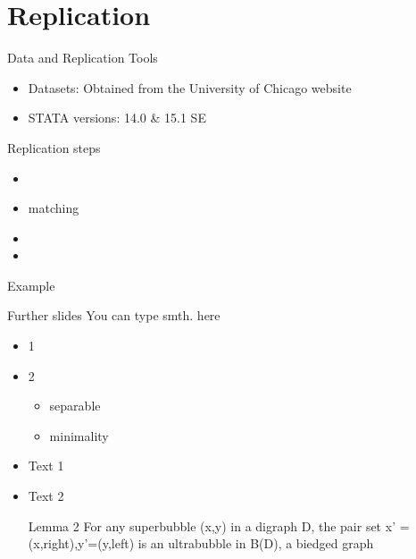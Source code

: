 \documentclass{beamer}
\begin{document}
\section{Replication}
\begin{frame}{Data and Replication Tools}
\begin{itemize}
    \item Datasets: Obtained from the University of Chicago website \item STATA versions: 14.0 &  15.1 SE
\end{itemize}
\end{frame}
\begin{frame}{Replication steps}
 \begin{itemize}
    \item 
    \item matching
    \item 
    \item 
\end{itemize}
\end{frame}
\begin{frame}{ Example}

\end{frame}
\begin{frame}{Further slides}
You can type smth. here
\begin{itemize}
    \item 1
    \item 2
    \begin{itemize}
        \item separable
        \item minimality
    \end{itemize}
    \item Text 1
    \item Text 2
    \begin{block}{Lemma 2}
    For any superbubble (x,y) in a digraph D, the pair set {x' = (x,right),y'=(y,left)} is an ultrabubble in B(D), a biedged graph
    \end{block}
\end{itemize}
\end{frame}
\end{document}
